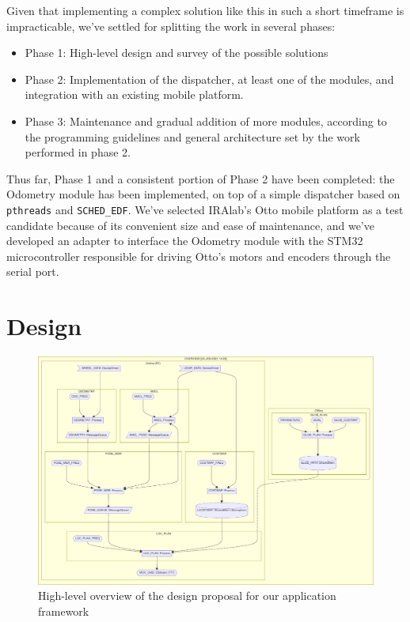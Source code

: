 \documentclass[a4paper,12pt]{report}
\begin{document}
Given that implementing a complex solution like this in such a short timeframe is impracticable, we've settled for splitting the work in several phases:
\begin{itemize}
  \item Phase 1: High-level design and survey of the possible solutions
  \item Phase 2: Implementation of the dispatcher, at least one of the modules, and integration with an existing mobile platform.
  \item Phase 3: Maintenance and gradual addition of more modules, according to the programming guidelines and general architecture set by the work performed in phase 2.
\end{itemize}

Thus far, Phase 1 and a consistent portion of Phase 2 have been completed: the Odometry module has been implemented, on top of a simple dispatcher based on \texttt{pthreads} and \texttt{SCHED\_EDF}. We've selected IRAlab's Otto \cite{fdila-bs-otto} mobile platform as a test candidate because of its convenient size and ease of maintenance, and we've developed an adapter to interface the Odometry module with the STM32 microcontroller responsible for driving Otto's motors and encoders through the serial port.

\section{Design}

\begin{figure}[H]
    \centering
    \includegraphics[width=\textwidth]{img/overview.pdf}
    \caption{High-level overview of the design proposal for our application framework}
\end{figure}
\end{document}
